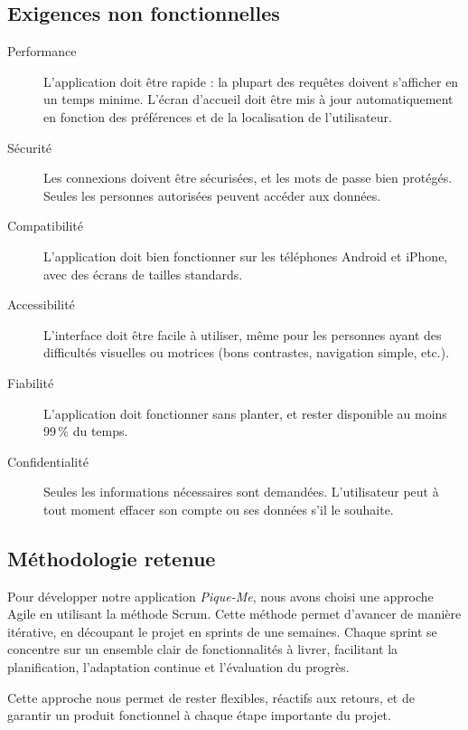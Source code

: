 \documentclass[12pt,a4paper]{article}
\begin{document}
\subsection{Exigences non fonctionnelles}
\begin{description}
  \item[Performance] L'application doit être rapide : la plupart des requêtes doivent s'afficher en un temps minime. L'écran d'accueil doit être mis à jour automatiquement en fonction des préférences et de la localisation de l'utilisateur.
  
  \item[Sécurité] Les connexions doivent être sécurisées, et les mots de passe bien protégés. Seules les personnes autorisées peuvent accéder aux données.
  
  \item[Compatibilité] L'application doit bien fonctionner sur les téléphones Android et iPhone, avec des écrans de tailles standards.
  
  \item[Accessibilité] L'interface doit être facile à utiliser, même pour les personnes ayant des difficultés visuelles ou motrices (bons contrastes, navigation simple, etc.).
  
  \item[Fiabilité] L'application doit fonctionner sans planter, et rester disponible au moins 99\,\% du temps.
  
  \item[Confidentialité] Seules les informations nécessaires sont demandées. L'utilisateur peut à tout moment effacer son compte ou ses données s'il le souhaite.
\end{description}


\subsection{Méthodologie retenue}

Pour développer notre application \textit{Pique-Me}, nous avons choisi une approche Agile en utilisant la méthode Scrum. Cette méthode permet d'avancer de manière itérative, en découpant le projet en sprints de une semaines. Chaque sprint se concentre sur un ensemble clair de fonctionnalités à livrer, facilitant la planification, l'adaptation continue et l'évaluation du progrès.


Cette approche nous permet de rester flexibles, réactifs aux retours, et de garantir un produit fonctionnel à chaque étape importante du projet.
\end{document}
